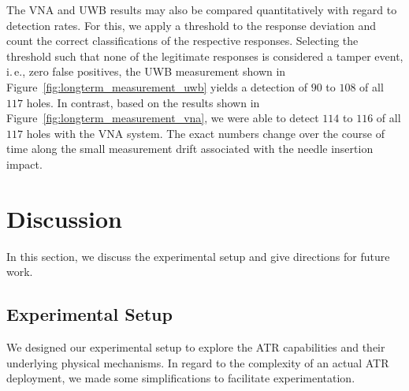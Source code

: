 \documentclass[conference]{IEEEtran}
\makeatletter
\newcommand{\ie}{i.\@\,e.\@\xspace}
\makeatother
\begin{document}
The VNA and UWB results may also be compared quantitatively with regard to detection rates. For this, we apply a threshold to the response deviation and count the correct classifications of the respective responses. Selecting the threshold such that none of the legitimate responses is considered a tamper event, \ie, zero false positives, the UWB measurement shown in Figure~\ref{fig:longterm_measurement_uwb} yields a detection of $90$ to $108$ of all $117$ holes. In contrast, based on the results shown in Figure~\ref{fig:longterm_measurement_vna}, we were able to detect $114$ to $116$ of all $117$ holes with the VNA system. The exact numbers change over the course of time along the small measurement drift associated with the needle insertion impact.



















































 
\section{Discussion}
In this section, we discuss the experimental setup and give directions for future work.

\subsection{Experimental Setup}
We designed our experimental setup to explore the ATR capabilities and their underlying physical mechanisms. In regard to the complexity of an actual ATR deployment, we made some simplifications to facilitate experimentation.
\end{document}
